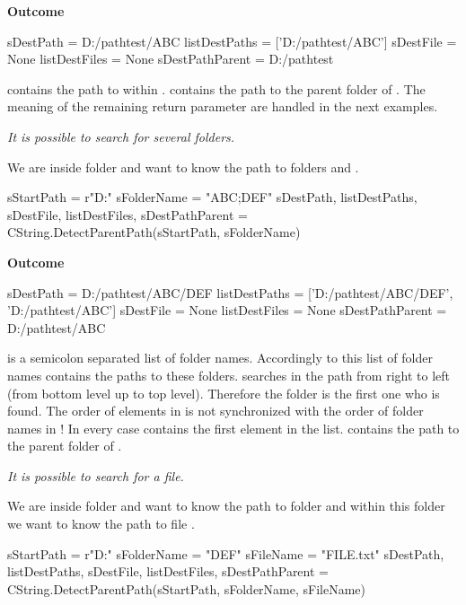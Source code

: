 \textbf{Outcome}

\begin{pythonlog}
sDestPath       = D:/pathtest/ABC
listDestPaths   = ['D:/pathtest/ABC']
sDestFile       = None
listDestFiles   = None
sDestPathParent = D:/pathtest
\end{pythonlog}

 contains the path to  within .
 contains the path to the parent folder of .
The meaning of the remaining return parameter are handled in the next examples.

\textit{It is possible to search for several folders.}

We are inside folder  and want to know the path to folders  and .

\begin{pythoncode}
sStartPath  = r"D:\pathtest\ABC\DEF\GHI"
sFolderName = "ABC;DEF"
sDestPath, listDestPaths, sDestFile, listDestFiles, sDestPathParent = CString.DetectParentPath(sStartPath, sFolderName)
\end{pythoncode}

\textbf{Outcome}

\begin{pythonlog}
sDestPath       = D:/pathtest/ABC/DEF
listDestPaths   = ['D:/pathtest/ABC/DEF', 'D:/pathtest/ABC']
sDestFile       = None
listDestFiles   = None
sDestPathParent = D:/pathtest/ABC
\end{pythonlog}

 is a semicolon separated list of folder names. Accordingly to this list of folder names 
contains the paths to these folders.  searches in the path from right to left (from bottom level up to top level).
Therefore the folder  is the first one who is found. The order of elements in  is not synchronized
with the order of folder names in !
In every case  contains the first element in the list.
 contains the path to the parent folder of .

\textit{It is possible to search for a file.}

We are inside folder  and want to know the path to folder  and within this folder we want to know the path to file .

\begin{pythoncode}
sStartPath  = r"D:\pathtest\ABC\DEF\GHI"
sFolderName = "DEF"
sFileName   = "FILE.txt"
sDestPath, listDestPaths, sDestFile, listDestFiles, sDestPathParent = CString.DetectParentPath(sStartPath, sFolderName, sFileName)
\end{pythoncode}

